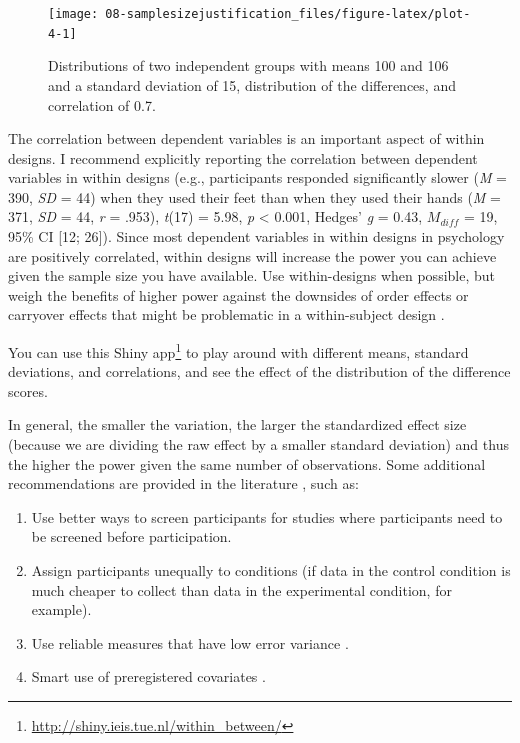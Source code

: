 \documentclass[
  oneside]{krantz}
\providecommand{\tightlist}{%
  \setlength{\itemsep}{0pt}\setlength{\parskip}{0pt}}
\renewcommand{\href}[2]{#2\footnote{\url{#1}}}
\begin{document}
\begin{figure}

{\centering \texttt{[image: 08-samplesizejustification\_files/figure-latex/plot-4-1]} 

}

\caption{Distributions of two independent groups with means 100 and 106 and a standard deviation of 15, distribution of the differences, and correlation of 0.7.}\label{fig:plot-4}
\end{figure}

The correlation between dependent variables is an important aspect of within designs. I recommend explicitly reporting the correlation between dependent variables in within designs (e.g., participants responded significantly slower (\emph{M} = 390, \emph{SD} = 44) when they used their feet than when they used their hands (\emph{M} = 371, \emph{SD} = 44, \emph{r} = .953), \emph{t}(17) = 5.98, \emph{p} \textless{} 0.001, Hedges' \emph{g} = 0.43, \(M_{diff}\) = 19, 95\% CI {[}12; 26{]}). Since most dependent variables in within designs in psychology are positively correlated, within designs will increase the power you can achieve given the sample size you have available. Use within-designs when possible, but weigh the benefits of higher power against the downsides of order effects or carryover effects that might be problematic in a within-subject design \citep{maxwell_designing_2017}.

You can use this \href{http://shiny.ieis.tue.nl/within_between/}{Shiny app} to play around with different means, standard deviations, and correlations, and see the effect of the distribution of the difference scores.

In general, the smaller the variation, the larger the standardized effect size (because we are dividing the raw effect by a smaller standard deviation) and thus the higher the power given the same number of observations. Some additional recommendations are provided in the literature \citep{allison_power_1997, bausell_power_2002, hallahan_statistical_1996}, such as:

\begin{enumerate}
\def\labelenumi{\arabic{enumi}.}
\tightlist
\item
  Use better ways to screen participants for studies where participants need to be screened before participation.
\item
  Assign participants unequally to conditions (if data in the control condition is much cheaper to collect than data in the experimental condition, for example).
\item
  Use reliable measures that have low error variance \citep{williams_impact_1995}.
\item
  Smart use of preregistered covariates \citep{meyvis_increasing_2018}.
\end{enumerate}
\end{document}
